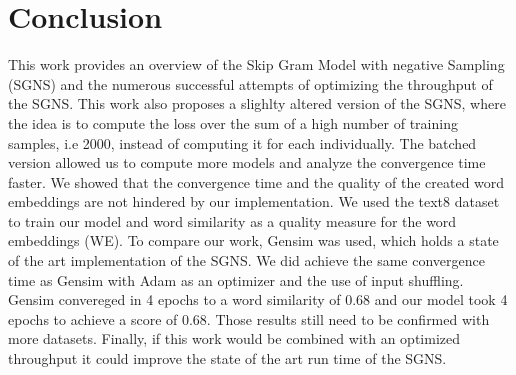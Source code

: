 
\section{Conclusion}\label{sec:conclusion}

This work provides an overview of the Skip Gram Model with negative Sampling (SGNS) and the numerous successful attempts of optimizing the throughput of the SGNS. This work also proposes a slighlty altered version of the SGNS, where the idea is to compute the loss over the sum of a high number of training samples, i.e 2000,  instead of computing it for each individually. The batched version allowed us to compute more models and analyze the convergence time faster. We showed that the convergence time and the quality of the created word embeddings are not hindered by our implementation. We used the text8 dataset to train our model and  word similarity as a quality measure for the word embeddings (WE).
To compare our work, Gensim was used, which holds a state of the art implementation of the SGNS. We did achieve the same convergence time as Gensim with Adam as an optimizer and the use of input shuffling. Gensim convereged in 4 epochs to a word similarity of 0.68 and our model  took 4 epochs to achieve a score of 0.68. Those results still need to be confirmed with more datasets. Finally, if this work would be combined with an optimized throughput it  could improve the state of the art run time of the SGNS.